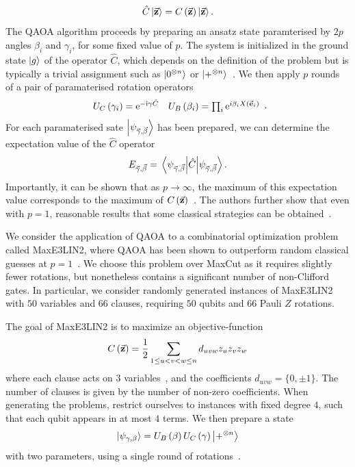 \[\hat{C}\ket{\va{z}}=C\left(\va{z}\right)\ket{\va{z}}.\]
The QAOA algorithm proceeds by preparing an ansatz state paramterised by $2p$ angles $\beta_{i}$ and $\gamma_{i}$, for some fixed value of $p$. The system is initialized in the ground state $\ket{g}$ of the operator $\hat{C}$, which depends on the definition of the problem but is typically a trivial assignment such as $\ket{0^{\otimes n}}$ or $\ket{+^{\otimes n}}$~\cite{Farhi2014,Farhi2014b}. We then apply $p$ rounds of a pair of paramaterised rotation operators
\[\begin{array}{lr}
U_{C}\left(\gamma_{i}\right)=\mathrm{e}^{-\mathrm{i} \gamma \hat{C}} &  U_{B}\left(\beta_{i}\right) = \prod_{i}\mathrm{e}^{i\beta_{i} X(\va{e}_{i})}
\end{array}.\]
For each paramaterised sate $\ket{\psi_{\va{\gamma},\va{\beta}}}$ has been prepared, we can determine the expectation value of the $\hat{C}$ operator 
\[E_{\va{\gamma},\va{\beta}}=\matrixel{\psi_{\va{\gamma},\va{\beta}}}{\hat{C}}{\psi_{\va{\gamma},\va{\beta}}}.\]
Importantly, it can be shown that as $p\rightarrow \infty$, the maximum of this expectation value corresponds to the maximum of $C\left(\va{z}\right)$~\cite{Farhi2014}. The authors further show that even with $p=1$, reasonable results that some classical strategies can be obtained~\cite{Farhi2014,Farhi2014b}.\par
We consider the application of QAOA to a combinatorial optimization problem called MaxE3LIN2, where QAOA has been shown to outperform random classical guesses at $p=1$~\cite{Farhi2014b}. We choose this problem over MaxCut as it requires slightly fewer rotations, but nonetheless contains a significant number of non-Clifford gates. In particular, we consider randomly generated instances of MaxE3LIN2 with $50$ variables and $66$ clauses, requiring $50$ qubits and $66$ Pauli $Z$ rotations.\par
The goal of MaxE3LIN2 is to maximize an objective-function
\[C\left(\va{z}\right) = \frac{1}{2}\sum_{1\leq u < v < w \leq n} d_{uvw}z_{u}z_{v}z_{w}\]
where each clause acts on $3$ variables~\cite{Farhi2014b,Bravyi2018}, and the coefficients $d_{uvw}=\{0,\pm1\}$. The number of clauses is given by the number of non-zero coefficients. When generating the problems, restrict ourselves to instances with fixed degree $4$, such that each qubit appears in at most $4$ terms. We then prepare a state 
\[\ket{\psi_{\gamma,\beta}} = U_{B}\left(\beta\right)U_{C}\left(\gamma\right)\ket{+^{\otimes n}}\]
with two parameters, using a single round of rotations~\cite{Farhi2014b}.\par
